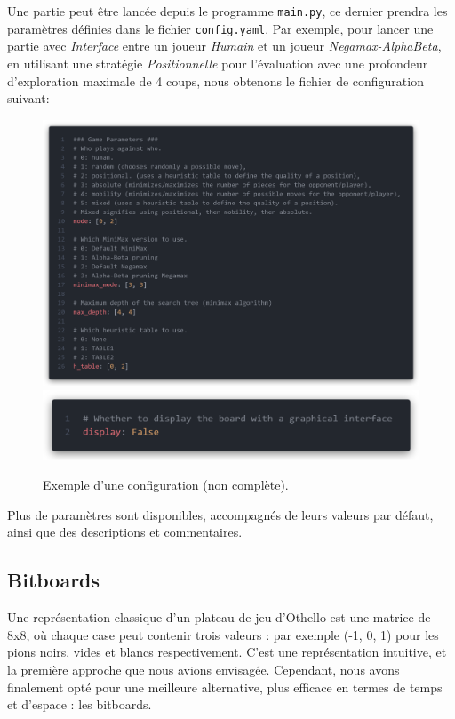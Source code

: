 Une partie peut être lancée depuis le programme \texttt{main.py}, ce dernier prendra les paramètres définies dans le fichier \texttt{config.yaml}. Par exemple, pour lancer une partie avec \textit{Interface} entre un joueur \textit{Humain} et un joueur \textit{Negamax-AlphaBeta}, en utilisant une stratégie \textit{Positionnelle} pour l'évaluation avec une profondeur d'exploration maximale de 4 coups, nous obtenons le fichier de configuration suivant: 
\begin{figure}[H]
    \centering
    \includegraphics[width=\textwidth]{ressources/configYaml.png}
    \includegraphics[width=\textwidth]{ressources/configYaml-display.png}
    \caption{Exemple d'une configuration (non complète).}
    \label{fig:configYaml}
\end{figure}

Plus de paramètres sont disponibles, accompagnés de leurs valeurs par défaut, ainsi que des descriptions et commentaires.


\subsection{Bitboards}
\label{subsec:bit}
Une représentation classique d'un plateau de jeu d'Othello est une matrice de 8x8, où chaque case peut contenir trois valeurs : par exemple (-1, 0, 1) pour les pions noirs, vides et blancs respectivement. C'est une représentation intuitive, et la première approche que nous avions envisagée. Cependant, nous avons finalement opté pour une meilleure alternative, plus efficace en termes de temps et d'espace : les bitboards.

